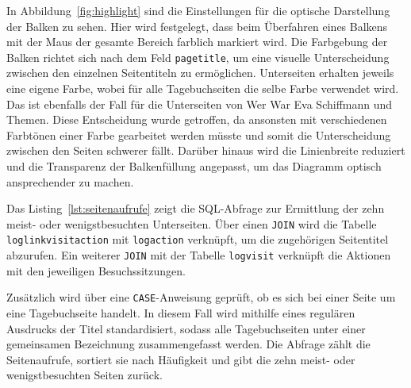 In Abbildung~\ref{fig:highlight} sind die Einstellungen für die optische Darstellung der Balken zu sehen. Hier wird festgelegt, dass beim Überfahren eines Balkens mit der Maus der gesamte Bereich farblich markiert wird. Die Farbgebung der Balken richtet sich nach dem Feld \texttt{page\textunderscore title}, um eine visuelle Unterscheidung zwischen den einzelnen Seitentiteln zu ermöglichen. Unterseiten erhalten jeweils eine eigene Farbe, wobei für alle Tagebuchseiten die selbe Farbe verwendet wird. Das ist ebenfalls der Fall für die Unterseiten von \glqq Wer War Eva Schiffmann\grqq{} und \glqq Themen\grqq{}. Diese Entscheidung wurde getroffen, da ansonsten mit verschiedenen Farbtönen einer Farbe gearbeitet werden müsste und somit die Unterscheidung zwischen den Seiten schwerer fällt. Darüber hinaus wird die Linienbreite reduziert und die Transparenz der Balkenfüllung angepasst, um das Diagramm optisch ansprechender zu machen.

\begin{figure}[H]
    \centering
    \begin{minipage}{\textwidth}
        
    \end{minipage}
\end{figure}

Das Listing~\ref{lst:seitenaufrufe} zeigt die SQL-Abfrage zur Ermittlung der zehn meist- oder wenigstbesuchten Unterseiten. Über einen \texttt{JOIN} wird die Tabelle \texttt{log\textunderscore link\textunderscore visit\textunderscore action} mit \texttt{log\textunderscore action} verknüpft, um die zugehörigen Seitentitel abzurufen. Ein weiterer \texttt{JOIN} mit der Tabelle \texttt{log\textunderscore visit} verknüpft die Aktionen mit den jeweiligen Besuchssitzungen.

Zusätzlich wird über eine \texttt{CASE}-Anweisung geprüft, ob es sich bei einer Seite um eine Tagebuchseite handelt. In diesem Fall wird mithilfe eines regulären Ausdrucks der Titel standardisiert, sodass alle Tagebuchseiten unter einer gemeinsamen Bezeichnung zusammengefasst werden. Die Abfrage zählt die Seitenaufrufe, sortiert sie nach Häufigkeit und gibt die zehn meist- oder wenigstbesuchten Seiten zurück.

